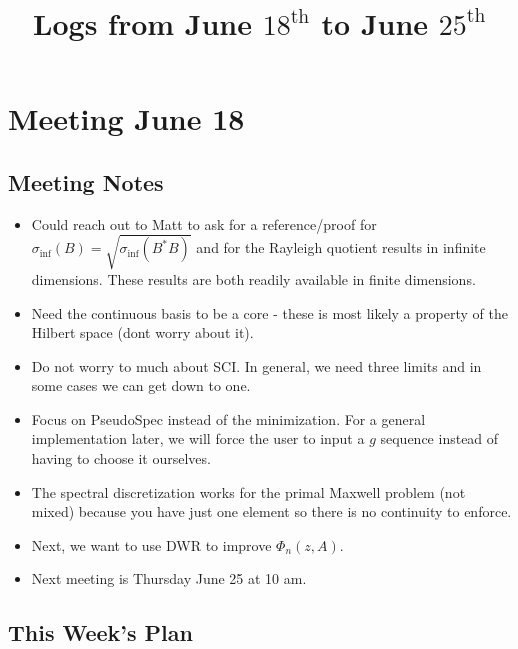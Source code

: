 \documentclass[12pt,a4paper]{article}
\title{Logs from June $18^{\text{th}}$ to June $25^{\text{th}}$}
\author{}
\date{}
\begin{document}
\maketitle

\section{Meeting June 18}









\subsection{Meeting Notes}

\begin{itemize}
    \item Could reach out to Matt to ask for a reference/proof for $\sigma_{\text{inf}}(B) = \sqrt{\sigma_{\text{inf}}(B^*B)}$ and for the Rayleigh quotient results in infinite dimensions. These results are both readily available in finite dimensions.
    \item Need the continuous basis to be a core - these is most likely a property of the Hilbert space (dont worry about it). 
    \item Do not worry to much about SCI. In general, we need three limits and in some cases we can get down to one.
    \item Focus on PseudoSpec instead of the minimization. For a general implementation later, we will force the user to input a $g$ sequence instead of having to choose it ourselves. 
    \item The spectral discretization works for the primal Maxwell problem (not mixed) because you have just one element so there is no continuity to enforce. 
    \item Next, we want to use DWR to improve $\Phi_n(z, A).$
    \item Next meeting is Thursday June 25 at 10 am.
\end{itemize}



\subsection{This Week's Plan}
\end{document}
